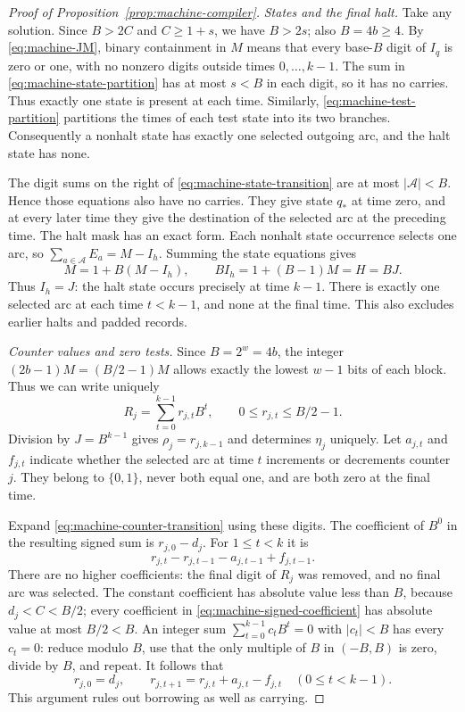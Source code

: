 \begin{proof}[Proof of Proposition~\ref{prop:machine-compiler}]
\emph{States and the final halt.}
Take any solution. Since $B>2C$ and $C\geq 1+s$, we have $B>2s$;
also $B=4b\geq 4$. By \eqref{eq:machine-JM}, binary containment in $M$
means that every base-$B$ digit of $I_q$ is zero or one, with no
nonzero digits outside times $0,\ldots,k-1$. The sum in
\eqref{eq:machine-state-partition} has at most $s<B$ in each digit,
so it has no carries. Thus exactly one state is present at each time.
Similarly, \eqref{eq:machine-test-partition} partitions the times of
each test state into its two branches. Consequently a nonhalt state
has exactly one selected outgoing arc, and the halt state has none.

The digit sums on the right of
\eqref{eq:machine-state-transition} are at most
$|\mathcal A|<B$. Hence those equations also have no carries. They
give state $q_*$ at time zero, and at every later time they give the
destination of the selected arc at the preceding time. The halt mask
has an exact form. Each nonhalt state occurrence selects one arc, so
$\sum_{a\in\mathcal A}E_a=M-I_h$. Summing the state equations gives
\[
 M=1+B(M-I_h),\qquad
 BI_h=1+(B-1)M=H=BJ.
\]
Thus $I_h=J$: the halt state occurs precisely at time $k-1$.
There is exactly one selected arc at each time $t<k-1$, and none
at the final time. This also excludes earlier halts and padded records.

\emph{Counter values and zero tests.}
Since $B=2^w=4b$, the integer
$(2b-1)M=(B/2-1)M$ allows exactly the lowest $w-1$ bits of each
block. Thus we can write uniquely
\begin{equation}\label{eq:machine-counter-digits}
 R_j=\sum_{t=0}^{k-1}r_{j,t}B^t,
 \qquad 0\leq r_{j,t}\leq B/2-1.
\end{equation}
Division by $J=B^{k-1}$ gives $\rho_j=r_{j,k-1}$ and determines
$\eta_j$ uniquely. Let $a_{j,t}$ and $f_{j,t}$ indicate whether the
selected arc at time $t$ increments or decrements counter $j$.
They belong to $\{0,1\}$, never both equal one, and are both zero
at the final time.

Expand \eqref{eq:machine-counter-transition} using these digits.
The coefficient of $B^0$ in the resulting signed sum is
$r_{j,0}-d_j$. For $1\leq t<k$ it is
\begin{equation}\label{eq:machine-signed-coefficient}
 r_{j,t}-r_{j,t-1}-a_{j,t-1}+f_{j,t-1}.
\end{equation}
There are no higher coefficients: the final digit of $R_j$ was
removed, and no final arc was selected. The constant coefficient has
absolute value less than $B$, because $d_j<C<B/2$; every coefficient
in \eqref{eq:machine-signed-coefficient} has absolute value at most
$B/2<B$. An integer sum $\sum_{t=0}^{k-1}c_tB^t=0$ with
$|c_t|<B$ has every $c_t=0$: reduce modulo $B$, use that the only
multiple of $B$ in $(-B,B)$ is zero, divide by $B$, and repeat.
It follows that
\begin{equation}\label{eq:machine-actual-update}
 r_{j,0}=d_j,\qquad
 r_{j,t+1}=r_{j,t}+a_{j,t}-f_{j,t}\quad(0\leq t<k-1).
\end{equation}
This argument rules out borrowing as well as carrying.


\end{proof}
